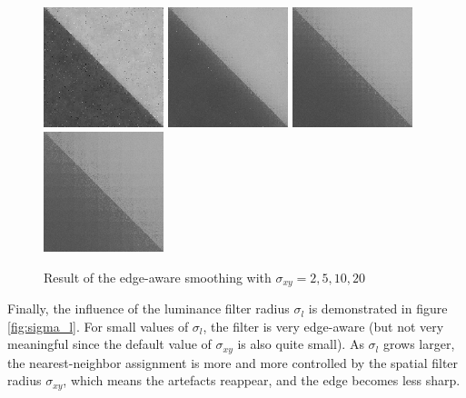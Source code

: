 \documentclass{article}
\begin{document}
\begin{figure}
    \centering
    \includegraphics[width=3.5cm]{pictures/BW/smoothing_diag_sigmaxy_100_2_50_new.png}
    \includegraphics[width=3.5cm]{pictures/BW/smoothing_diag_sigmaxy_100_5_50_new.png}
    \includegraphics[width=3.5cm]{pictures/BW/smoothing_diag_sigmaxy_100_10_50_new.png}
    \includegraphics[width=3.5cm]{pictures/BW/smoothing_diag_sigmaxy_100_20_50_new.png}
    \caption{Result of the edge-aware smoothing with $\sigma_{xy} = 2, 5, 10, 20$}
    \label{fig:sigma_xy}
\end{figure}

\medskip

Finally, the influence of the luminance filter radius $\sigma_{l}$ is demonstrated in figure \ref{fig:sigma_l}. For small values of $\sigma_l$, the filter is very edge-aware (but not very meaningful since the default value of $\sigma_{xy}$ is also quite small). As $\sigma_l$ grows larger, the nearest-neighbor assignment is more and more controlled by the spatial filter radius $\sigma_{xy}$, which means the artefacts reappear, and the edge becomes less sharp.
\end{document}
